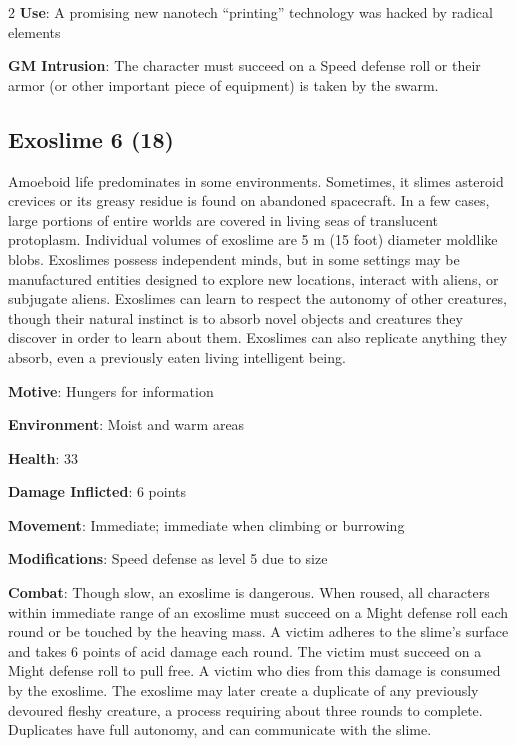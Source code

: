 \begin{multicols}{2}
\textbf{Use}: A promising new nanotech “printing” technology was hacked by radical elements

\textbf{GM Intrusion}: The character must succeed on a Speed defense roll or their armor (or other important piece of equipment) is taken by the swarm.

\subsection{Exoslime 6 (18)}

Amoeboid life predominates in some environments. Sometimes, it slimes asteroid crevices or its greasy residue is found on abandoned spacecraft. In a few cases, large portions of entire worlds are covered in living seas of translucent protoplasm. Individual volumes of exoslime are 5 m (15 foot) diameter moldlike blobs. Exoslimes possess independent minds, but in some settings may be manufactured entities designed to explore new locations, interact with aliens, or subjugate aliens. Exoslimes can learn to respect the autonomy of other creatures, though their natural instinct is to absorb novel objects and creatures they discover in order to learn about them. Exoslimes can also replicate anything they absorb, even a previously eaten living intelligent being. 

\textbf{Motive}: Hungers for information 

\textbf{Environment}: Moist and warm areas 

\textbf{Health}: 33 

\textbf{Damage Inflicted}:  6 points 

\textbf{Movement}: Immediate; immediate when climbing or burrowing 

\textbf{Modifications}: Speed defense as level 5 due to size 

\textbf{Combat}: Though slow, an exoslime is dangerous. When roused, all characters within immediate range of an exoslime must succeed on a Might defense roll each round or be touched by the heaving mass. A victim adheres to the slime’s surface and takes 6 points of acid damage each round. The victim must succeed on a Might defense roll to pull free. A victim who dies from this damage is consumed by the exoslime. The exoslime may later create a duplicate of any previously devoured fleshy creature, a process requiring about three rounds to complete. Duplicates have full autonomy, and can communicate with the slime. 


\end{multicols}

